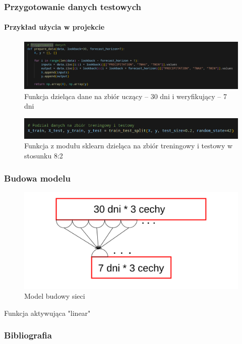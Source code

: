 \documentclass[usepdftitle=false,24pt]{beamer}
\begin{document}
\begin{frame}
    \frametitle{Przygotowanie danych testowych}
    \framesubtitle{Przykład użycia w projekcie}

    \begin{figure}
        \includegraphics[width=\textwidth]{images/prepare_data.png}
        \caption{Funkcja dzieląca dane na zbiór uczący -- 30 dni i weryfikujący -- 7 dni}
    \end{figure}


    \begin{figure}
        \includegraphics[width=\textwidth]{images/train_split.png}
        \caption{Funkcja z modułu sklearn \cite{split-sklearn} dzieląca na zbiór treningowy i testowy w stosunku 8:2}
    \end{figure}
\end{frame}

\begin{frame}
    \frametitle{Budowa modelu}

    \begin{figure}
        \includegraphics[width=\textwidth]{images/budowa_sieci.png}
        \caption{Model budowy sieci}
    \end{figure}

    \hspace*{1cm}

    \begin{center}
        Funkcja aktywująca "linear"
    \end{center}

\end{frame}

\begin{frame}[allowframebreaks]
    \frametitle{Bibliografia}
    
    

\end{frame}
\end{document}
